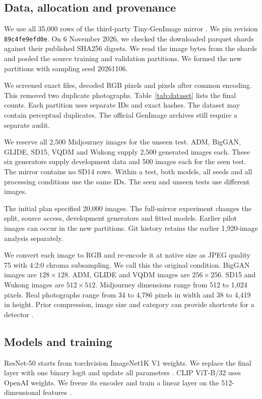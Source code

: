 \documentclass[11pt,a4paper]{article}
\newcommand{\resultstable}[1]{}
\begin{document}
\subsection{Data, allocation and provenance}
We use all 35,000 rows of the third-party Tiny-GenImage mirror \cite{r33,r34}. We pin revision \texttt{89c4fe9efd0e}. On 6 November 2026, we checked the downloaded parquet shards against their published SHA256 digests. We read the image bytes from the shards and pooled the source training and validation partitions. We formed the new partitions with sampling seed 20261106.

We screened exact files, decoded RGB pixels and pixels after common encoding. This removed two duplicate photographs. Table~\ref{tab:dataset} lists the final counts. Each partition uses separate IDs and exact hashes. The dataset may contain perceptual duplicates. The official GenImage archives still require a separate audit.

We reserve all 2,500 Midjourney images for the unseen test. ADM, BigGAN, GLIDE, SD15, VQDM and Wukong supply 2,500 generated images each. These six generators supply development data and 500 images each for the seen test. The mirror contains no SD14 rows. Within a test, both models, all seeds and all processing conditions use the same IDs. The seen and unseen tests use different images.

The initial plan specified 20,000 images. The full-mirror experiment changes the split, source access, development generators and fitted models. Earlier pilot images can occur in the new partitions. Git history retains the earlier 1,920-image analysis separately.

We convert each image to RGB and re-encode it at native size as JPEG quality 75 with 4:2:0 chroma subsampling. We call this the original condition. BigGAN images are $128\times128$. ADM, GLIDE and VQDM images are $256\times256$. SD15 and Wukong images are $512\times512$. Midjourney dimensions range from 512 to 1,024 pixels. Real photographs range from 34 to 4,786 pixels in width and 38 to 4,419 in height. Prior compression, image size and category can provide shortcuts for a detector \cite{r35}.

\resultstable{dataset}

\subsection{Models and training}
ResNet-50 starts from torchvision ImageNet1K V1 weights. We replace the final layer with one binary logit and update all parameters \cite{r36,r37}. CLIP ViT-B/32 uses OpenAI weights. We freeze its encoder and train a linear layer on the 512-dimensional features \cite{r38,r39}.
\end{document}
